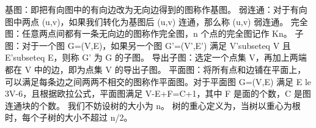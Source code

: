 \markdownRendererDocumentBegin
\markdownRendererSectionBegin
\markdownRendererSectionBegin
{}\markdownRendererInterblockSeparator
{}基图：即把有向图中的有向边改为无向边得到的图称作基图。\markdownRendererParagraphSeparator
{}弱连通：对于有向图中两点 \markdownRendererDollarSign{}(u,v)\markdownRendererDollarSign{}，如果我们转化为基图后 \markdownRendererDollarSign{}(u,v)\markdownRendererDollarSign{} 连通，那么称 \markdownRendererDollarSign{}(u,v)\markdownRendererDollarSign{} 弱连通。\markdownRendererParagraphSeparator
{}完全图：任意两点间都有一条无向边的图称作完全图，\markdownRendererDollarSign{}n\markdownRendererDollarSign{} 个点的完全图记作 \markdownRendererDollarSign{}K\markdownRendererUnderscore{}n\markdownRendererDollarSign{}。\markdownRendererParagraphSeparator
{}子图：对于一个图 \markdownRendererDollarSign{}G=(V,E)\markdownRendererDollarSign{}，如果另一个图 \markdownRendererDollarSign{}G'=(V',E')\markdownRendererDollarSign{} 满足 \markdownRendererDollarSign{}V'\markdownRendererBackslash{}subseteq V\markdownRendererDollarSign{} 且 \markdownRendererDollarSign{}E'\markdownRendererBackslash{}subseteq E\markdownRendererDollarSign{}，则称 \markdownRendererDollarSign{}G'\markdownRendererDollarSign{} 为 \markdownRendererDollarSign{}G\markdownRendererDollarSign{} 的子图。\markdownRendererParagraphSeparator
{}导出子图：选定一个点集 \markdownRendererDollarSign{}V\markdownRendererDollarSign{}，再加上两端都在 \markdownRendererDollarSign{}V\markdownRendererDollarSign{} 中的边，即为点集 \markdownRendererDollarSign{}V\markdownRendererDollarSign{} 的导出子图。\markdownRendererParagraphSeparator
{}平面图：将所有点和边铺在平面上，可以满足每条边之间两两不相交的图称作平面图。对于平面图 \markdownRendererDollarSign{}G=(V,E)\markdownRendererDollarSign{} 满足 \markdownRendererDollarSign{}E \markdownRendererBackslash{}le 3V-6\markdownRendererDollarSign{}，且根据欧拉公式，平面图满足 \markdownRendererDollarSign{}V-E+F=C+1\markdownRendererDollarSign{}，其中 \markdownRendererDollarSign{}F\markdownRendererDollarSign{} 是面的个数，\markdownRendererDollarSign{}C\markdownRendererDollarSign{} 是图连通块的个数。\markdownRendererInterblockSeparator
{}
\markdownRendererSectionEnd \markdownRendererSectionBegin
{}\markdownRendererInterblockSeparator
{}\markdownRendererSectionBegin
{}\markdownRendererInterblockSeparator
{}我们不妨设树的大小为 \markdownRendererDollarSign{}n\markdownRendererDollarSign{}。\markdownRendererParagraphSeparator
{}树的重心定义为，当树以重心为根时，每个子树的大小不超过 \markdownRendererDollarSign{}n/2\markdownRendererDollarSign{}。\markdownRendererParagraphSeparator
